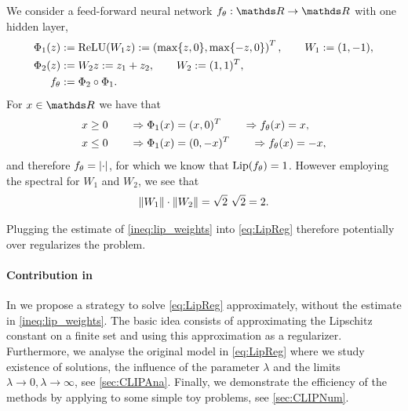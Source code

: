 \begin{example}{}{}
We consider a feed-forward neural network $\net_\param:\R\to\R$ with one hidden layer,
%
\begin{align*}
\Phi_1(z) &:= \operatorname{ReLU}(W_1 z) :=\left(\max\{z, 0\}, \max\{-z, 0\}\right)^T,\qquad 
W_1:= (1,-1),\\
\Phi_2(z) &:= W_2 z := z_1 + z_2,\qquad W_2:=(1,1)^T,\\
f_\theta&:= \Phi_2\circ\Phi_1.
\end{align*}
%
For $\inp\in\R$ we have that 
%
\begin{align*}
x&\geq 0 \qquad\Rightarrow\Phi_1(x) = (x, 0)^T \qquad\Rightarrow f_\theta(x)=x,\\
x&\leq 0 \qquad\Rightarrow\Phi_1(x) = (0, -x)^T \qquad\Rightarrow f_\theta(x)=-x,
\end{align*}
%
and therefore $f_\theta = \left|\cdot\right|$, for which we know that $\operatorname*{Lip}(f_\theta)=1$. However employing the spectral for $W_1$ and $W_2$, we see that
%
\begin{align*}
\|W_1\|\cdot\|W_2\| = \sqrt{2}\ \sqrt{2} = 2.	
\end{align*}
%
\end{example}
%
Plugging the estimate of \cref{ineq:lip_weights} into \cref{eq:LipReg} therefore potentially over regularizes the problem.
%
\paragraph{Contribution in \cite{bungert2021clip}} In \cite{bungert2021clip} we propose a strategy to solve \cref{eq:LipReg} approximately, without the estimate in \cref{ineq:lip_weights}. The basic idea consists of approximating the Lipschitz constant on a finite set and using this approximation as a regularizer. Furthermore, we analyse the original model in \cref{eq:LipReg} where we study existence of solutions, the influence of the parameter $\lambda$ and the limits $\lambda\to 0, \lambda\to \infty$, see \cref{sec:CLIPAna}. Finally, we demonstrate the efficiency of the methods by applying to some simple toy problems, see \cref{sec:CLIPNum}.


